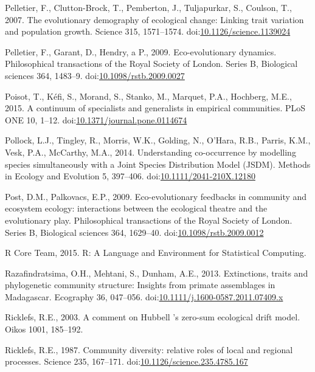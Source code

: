 \hypertarget{ref-Pelletier2007}{}
Pelletier, F., Clutton-Brock, T., Pemberton, J., Tuljapurkar, S.,
Coulson, T., 2007. The evolutionary demography of ecological change:
Linking trait variation and population growth. Science 315, 1571--1574.
doi:\href{https://doi.org/10.1126/science.1139024}{10.1126/science.1139024}

\hypertarget{ref-Pelletier2009}{}
Pelletier, F., Garant, D., Hendry, a P., 2009. Eco-evolutionary
dynamics. Philosophical transactions of the Royal Society of London.
Series B, Biological sciences 364, 1483--9.
doi:\href{https://doi.org/10.1098/rstb.2009.0027}{10.1098/rstb.2009.0027}

\hypertarget{ref-Poisot2015c}{}
Poisot, T., Kéfi, S., Morand, S., Stanko, M., Marquet, P.A., Hochberg,
M.E., 2015. A continuum of specialists and generalists in empirical
communities. PLoS ONE 10, 1--12.
doi:\href{https://doi.org/10.1371/journal.pone.0114674}{10.1371/journal.pone.0114674}

\hypertarget{ref-Pollock2014}{}
Pollock, L.J., Tingley, R., Morris, W.K., Golding, N., O'Hara, R.B.,
Parris, K.M., Vesk, P.A., McCarthy, M.A., 2014. Understanding
co-occurrence by modelling species simultaneously with a Joint Species
Distribution Model (JSDM). Methods in Ecology and Evolution 5, 397--406.
doi:\href{https://doi.org/10.1111/2041-210X.12180}{10.1111/2041-210X.12180}

\hypertarget{ref-Post2009}{}
Post, D.M., Palkovacs, E.P., 2009. Eco-evolutionary feedbacks in
community and ecosystem ecology: interactions between the ecological
theatre and the evolutionary play. Philosophical transactions of the
Royal Society of London. Series B, Biological sciences 364, 1629--40.
doi:\href{https://doi.org/10.1098/rstb.2009.0012}{10.1098/rstb.2009.0012}

\hypertarget{ref-Rcoreteam2015}{}
R Core Team, 2015. R: A Language and Environment for Statistical
Computing.

\hypertarget{ref-Razafindratsima2013}{}
Razafindratsima, O.H., Mehtani, S., Dunham, A.E., 2013. Extinctions,
traits and phylogenetic community structure: Insights from primate
assemblages in Madagascar. Ecography 36, 047--056.
doi:\href{https://doi.org/10.1111/j.1600-0587.2011.07409.x}{10.1111/j.1600-0587.2011.07409.x}

\hypertarget{ref-Ricklefs2003}{}
Ricklefs, R.E., 2003. A comment on Hubbell 's zero-sum ecological drift
model. Oikos 1001, 185--192.

\hypertarget{ref-Ricklefs1987}{}
Ricklefs, R.E., 1987. Community diversity: relative roles of local and
regional processes. Science 235, 167--171.
doi:\href{https://doi.org/10.1126/science.235.4785.167}{10.1126/science.235.4785.167}

